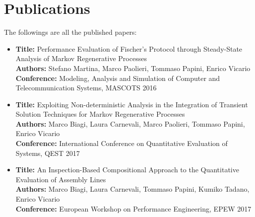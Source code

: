 
\section*{Publications}

  The followings are all the published papers:
  
  \begin{itemize}
    \item
      \textbf{Title:} Performance Evaluation of Fischer's Protocol through Steady-State Analysis of Markov Regenerative Processes\\
      \textbf{Authors:} Stefano Martina, Marco Paolieri, Tommaso Papini, Enrico Vicario\\
      \textbf{Conference:} Modeling, Analysis and Simulation of Computer and Telecommunication Systems, MASCOTS 2016
    \item
      \textbf{Title:} Exploiting Non-deterministic Analysis in the Integration of Transient Solution Techniques for Markov Regenerative Processes\\
      \textbf{Authors:} Marco Biagi, Laura Carnevali, Marco Paolieri, Tommaso Papini, Enrico Vicario\\
      \textbf{Conference:} International Conference on Quantitative Evaluation of Systems, QEST 2017
    \item
      \textbf{Title:} An Inspection-Based Compositional Approach to the Quantitative Evaluation of Assembly Lines\\
      \textbf{Authors:} Marco Biagi, Laura Carnevali, Tommaso Papini, Kumiko Tadano, Enrico Vicario\\
      \textbf{Conference:} European Workshop on Performance Engineering, EPEW 2017
  \end{itemize}

\newpage
